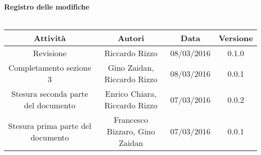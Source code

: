 \vspace{1cm}
   {\fontsize{15pt}{16pt}\selectfont \textbf{Registro delle modifiche}}\\ \\

\bgroup
\def\arraystretch{1.6}
\begin{tabular}{| c | c | c | c |}
\hline
\textbf{Attività} & \textbf{Autori} & \textbf{Data} & \textbf{Versione}\\ \hline \hline




Revisione & Riccardo Rizzo & 08/03/2016 & 0.1.0 \\ \hline  

Completamento sezione 3 & Gino Zaidan, Riccardo Rizzo & 08/03/2016 & 0.0.1 \\ \hline

Stesura seconda parte del documento & Enrico Chiara, Riccardo Rizzo & 07/03/2016 & 0.0.2 \\ \hline

Stesura prima parte del documento & Francesco Bizzaro, Gino Zaidan & 07/03/2016 & 0.0.1 \\ \hline 


\end{tabular}
\egroup
\newpage